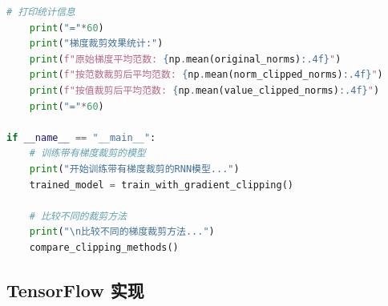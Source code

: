 \documentclass{article}
\begin{document}
\begin{lstlisting}[language=Python, caption={PyTorch中的梯度裁剪实现}]
    # 打印统计信息
    print("="*60)
    print("梯度裁剪效果统计:")
    print(f"原始梯度平均范数: {np.mean(original_norms):.4f}")
    print(f"按范数裁剪后平均范数: {np.mean(norm_clipped_norms):.4f}")
    print(f"按值裁剪后平均范数: {np.mean(value_clipped_norms):.4f}")
    print("="*60)

if __name__ == "__main__":
    # 训练带有梯度裁剪的模型
    print("开始训练带有梯度裁剪的RNN模型...")
    trained_model = train_with_gradient_clipping()

    # 比较不同的裁剪方法
    print("\n比较不同的梯度裁剪方法...")
    compare_clipping_methods()
\end{lstlisting}

\subsection{TensorFlow 实现}
\end{document}
